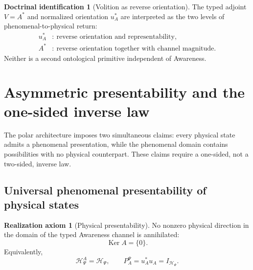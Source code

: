 \documentclass[11pt,reqno]{scrartcl}
\newcommand{\scrHP}{\mathscr H_{\Psi}}
\newcommand{\polA}{u_A}
\DeclareMathOperator{\Ker}{Ker}
\newcommand{\actHP}{\mathscr H_{\Psi}^{A}}
\newcommand{\suppProjP}{P_{A}^{\Psi}}
\theoremstyle{plain}
\theoremstyle{definition}
\newtheorem{axiom}[axiom]{Realization axiom}
\newtheorem{identification}[identification]{Doctrinal identification}
\theoremstyle{remark}
\begin{document}
\begin{identification}[Volition as reverse orientation]
\label{id:volition-reverse-orientation}
The typed adjoint $V=A^*$ and normalized orientation $u_A^*$ are interpreted
as the two levels of phenomenal-to-physical return:
\begin{equation}
  \boxed{
  \begin{aligned}
  u_A^*&:\ \text{reverse orientation and representability},\\
  A^*&:\ \text{reverse orientation together with channel magnitude}.
  \end{aligned}}
  \label{eq:volition-two-level-reading}
\end{equation}
Neither is a second ontological primitive independent of Awareness.
\end{identification}
\section{Asymmetric presentability and the one-sided inverse law}
\label{sec:asymmetric-presentability}

The polar architecture imposes two simultaneous claims: every physical state
admits a phenomenal presentation, while the phenomenal domain contains
possibilities with no physical counterpart.  These claims require a one-sided,
not a two-sided, inverse law.

\subsection{Universal phenomenal presentability of physical states}

\begin{axiom}[Physical presentability]
\label{ax:physical-presentability}
No nonzero physical direction in the domain of the typed Awareness channel is
annihilated:
\begin{equation}
  \boxed{\Ker A=\{0\}.}
  \label{eq:physical-presentability}
\end{equation}
Equivalently,
\begin{equation}
  \actHP=\scrHP,
  \qquad
  \suppProjP=\polA^*\polA=I_{\scrHP}.
  \label{eq:physical-presentability-polar}
\end{equation}
\end{axiom}
\end{document}

